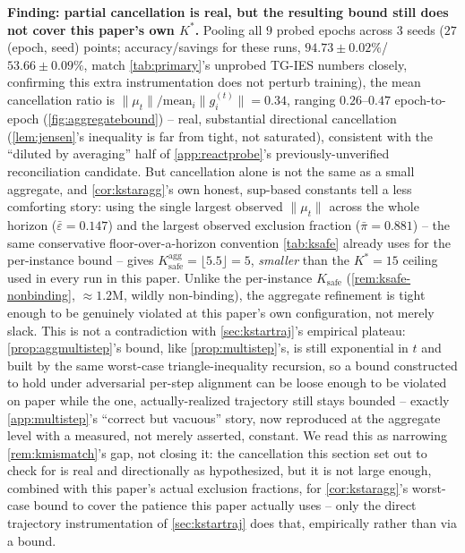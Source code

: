 \documentclass{article}
\theoremstyle{plain}
\theoremstyle{definition}
\theoremstyle{remark}
\begin{document}
\textbf{Finding: partial cancellation is real, but the resulting bound still does not cover this paper's own $K^*$.} Pooling all $9$ probed epochs across $3$ seeds ($27$ (epoch, seed) points; accuracy/savings for these runs, $94.73\pm0.02\%$/$53.66\pm0.09\%$, match \cref{tab:primary}'s unprobed TG-IES numbers closely, confirming this extra instrumentation does not perturb training), the mean cancellation ratio is $\|\mu_t\|/\mathrm{mean}_i\|g_i^{(t)}\| = 0.34$, ranging $0.26$--$0.47$ epoch-to-epoch (\cref{fig:aggregatebound}) -- real, substantial directional cancellation (\cref{lem:jensen}'s inequality is far from tight, not saturated), consistent with the ``diluted by averaging'' half of \cref{app:reactprobe}'s previously-unverified reconciliation candidate. But cancellation alone is not the same as a small aggregate, and \cref{cor:kstaragg}'s own honest, sup-based constants tell a less comforting story: using the single largest observed $\|\mu_t\|$ across the whole horizon ($\bar\varepsilon=0.147$) and the largest observed exclusion fraction ($\bar\pi=0.881$) -- the same conservative floor-over-a-horizon convention \cref{tab:ksafe} already uses for the per-instance bound -- gives $K_{\mathrm{safe}}^{\mathrm{agg}}=\lfloor5.5\rfloor=5$, \emph{smaller} than the $K^*{=}15$ ceiling used in every run in this paper. Unlike the per-instance $K_{\mathrm{safe}}$ (\cref{rem:ksafe-nonbinding}, $\approx\!1.2$M, wildly non-binding), the aggregate refinement is tight enough to be genuinely violated at this paper's own configuration, not merely slack. This is not a contradiction with \cref{sec:kstartraj}'s empirical plateau: \cref{prop:aggmultistep}'s bound, like \cref{prop:multistep}'s, is still exponential in $t$ and built by the same worst-case triangle-inequality recursion, so a bound constructed to hold under adversarial per-step alignment can be loose enough to be violated on paper while the one, actually-realized trajectory still stays bounded -- exactly \cref{app:multistep}'s ``correct but vacuous'' story, now reproduced at the aggregate level with a measured, not merely asserted, constant. We read this as narrowing \cref{rem:kmismatch}'s gap, not closing it: the cancellation this section set out to check for is real and directionally as hypothesized, but it is not large enough, combined with this paper's actual exclusion fractions, for \cref{cor:kstaragg}'s worst-case bound to cover the patience this paper actually uses -- only the direct trajectory instrumentation of \cref{sec:kstartraj} does that, empirically rather than via a bound.
\end{document}
